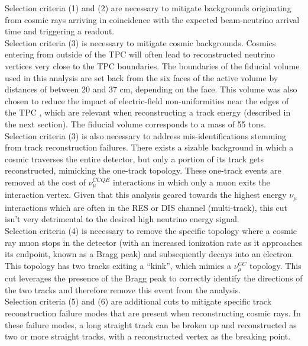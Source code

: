 Selection criteria (1) and (2) are necessary to mitigate backgrounds originating from cosmic rays arriving in coincidence with the expected beam-neutrino arrival time and triggering a readout. \\

Selection criteria (3) is necessary to mitigate cosmic backgrounds. Cosmics entering from outside of the TPC will often lead to reconstructed neutrino vertices very close to the TPC boundaries. The boundaries of the fiducial volume used in this analysis are set back from the six faces of the active volume by distances of between 20 and 37 cm, depending on the face. This volume was also chosen to reduce the impact of electric-field non-uniformities near the edges of the TPC \cite{SCE_publicnote}, which are relevant when reconstructing a track energy (described in the next section). The fiducial volume corresponds to a mass of 55 tons.\\

Selection criteria (3) is also necessary to address mis-identifications stemming from track reconstruction failures. There exists a sizable background in which a cosmic traverses the entire detector, but only a portion of its track gets reconstructed, mimicking the one-track topology. These one-track events are removed at the cost of $\nu_\mu^{CCQE}$ interactions in which only a muon exits the interaction vertex. Given that this analysis geared towards the highest energy $\nu_\mu$ interactions which are often in the RES or DIS channel (multi-track), this cut isn't very detrimental to the desired high neutrino energy signal.\\

Selection criteria (4) is necessary to remove the specific topology where a cosmic ray muon stops in the detector (with an increased ionization rate as it approaches its endpoint, known as a Bragg peak) and subsequently decays into an electron. This topology has two tracks exiting a ``kink'', which mimics a $\nu_\mu^{CC}$ topology. This cut leverages the presence of the Bragg peak to correctly identify the directions of the two tracks and therefore remove this event from the analysis.\\

Selection criteria (5) and (6) are additional cuts to mitigate specific track reconstruction failure modes that are present when reconstructing cosmic rays. In these failure modes, a long straight track can be broken up and reconstructed as two or more straight tracks, with a reconstructed vertex as the breaking point.\\

